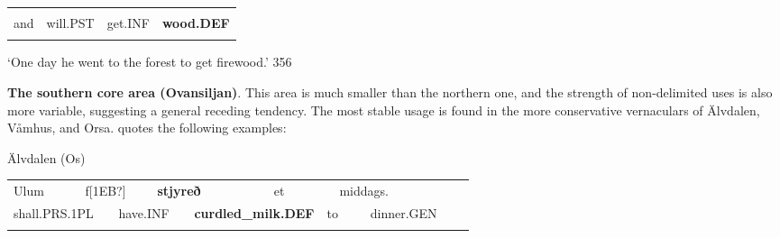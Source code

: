 \begin{tabular}{llll}
\lsptoprule
\multicolumn{4}{l}{å

}\\
and & will.PST & get.INF & {\bfseries wood.DEF}\\
\lspbottomrule
\end{tabular}

\begin{styleTranslation}
‘One day he went to the forest to get firewood.’ 356

\end{styleTranslation}

\begin{styleBodytextC}
\textbf{The southern core area (Ovansiljan)}. This area is much smaller than the northern one, and the strength of non-delimited uses is also more variable, suggesting a general receding tendency. The most stable usage is found in the more conservative vernaculars of Älvdalen, Våmhus, and Orsa. \citet[95]{Levander1909} quotes the following examples:

\end{styleBodytextC}

\begin{listWWNumileveli}
\item {}

\begin{styleExample}
Älvdalen (Os)

\end{styleExample}

\end{listWWNumileveli}

\begin{listWWNumxxvleveli}
\item {}

\end{listWWNumxxvleveli}

\begin{tabular}{llllllllllll}
\lsptoprule
Ulum & \multicolumn{2}{l}{f[1EB?]

} & \multicolumn{2}{l}{{\bfseries stjyreð}

} & \multicolumn{2}{l}{et

} & \multicolumn{2}{l}{middags.

} & \multicolumn{2}{l}{} & \\
\multicolumn{2}{l}{\footnotemark{}shall.PRS.1PL

} & \multicolumn{2}{l}{have.INF

} & \multicolumn{2}{l}{{\bfseries curdled\_milk.DEF}

} & \multicolumn{2}{l}{to

} & \multicolumn{2}{l}{dinner.GEN

} & \multicolumn{2}{l}{}\\
\lspbottomrule
\end{tabular}

